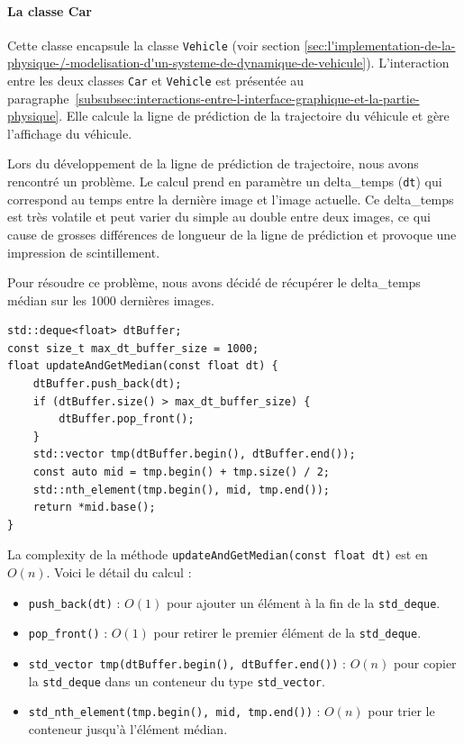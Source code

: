 \paragraph[Car]{La classe \textbf{Car}}
Cette classe encapsule la classe \texttt{Vehicle} (voir section \ref{sec:l'implementation-de-la-physique-/-modelisation-d'un-systeme-de-dynamique-de-vehicule}).
L'interaction entre les deux classes \texttt{Car} et \texttt{Vehicle} est présentée au paragraphe~\ref{subsubsec:interactions-entre-l-interface-graphique-et-la-partie-physique}.
Elle calcule la ligne de prédiction de la trajectoire du véhicule et gère l'affichage du véhicule.

Lors du développement de la ligne de prédiction de trajectoire, nous avons rencontré un problème.
Le calcul prend en paramètre un \gls{delta_temps} (\texttt{dt}) qui correspond au temps entre la dernière image et l'image actuelle.
Ce \gls{delta_temps} est très volatile et peut varier du simple au double entre deux images, ce qui cause de grosses différences de longueur de la ligne de prédiction et provoque une impression de scintillement.

Pour résoudre ce problème, nous avons décidé de récupérer le \gls{delta_temps} médian sur les 1000 dernières images.

\begin{lstlisting}[style=CStyle, label={lst:code_dequeue_dt}]
std::deque<float> dtBuffer;
const size_t max_dt_buffer_size = 1000;
float updateAndGetMedian(const float dt) {
    dtBuffer.push_back(dt);
    if (dtBuffer.size() > max_dt_buffer_size) {
        dtBuffer.pop_front();
    }
    std::vector tmp(dtBuffer.begin(), dtBuffer.end());
    const auto mid = tmp.begin() + tmp.size() / 2;
    std::nth_element(tmp.begin(), mid, tmp.end());
    return *mid.base();
}
\end{lstlisting}

La \gls{complexity} de la méthode \texttt{updateAndGetMedian(const float dt)} est en \( O(n) \).
Voici le détail du calcul :
\begin{itemize}
    \item \texttt{push\_back(dt)} : \( O(1) \)\cite{cpp_reference_push_back} pour ajouter un élément à la fin de la \texttt{\gls{std_deque}}.
    \item \texttt{pop\_front()} : \( O(1) \)\cite{cpp_reference_pop_front} pour retirer le premier élément de la \texttt{\gls{std_deque}}.
    \item \texttt{\gls{std_vector} tmp(dtBuffer.begin(), dtBuffer.end())} : \( O(n) \)\cite{cpp_reference_vector} pour copier la \texttt{\gls{std_deque}} dans un conteneur du type \texttt{\gls{std_vector}}.
    \item \texttt{\gls{std_nth_element}(tmp.begin(), mid, tmp.end())} : \( O(n) \)\cite{cpp_reference_std_nth_element} pour trier le conteneur jusqu'à l'élément médian.
\end{itemize}

